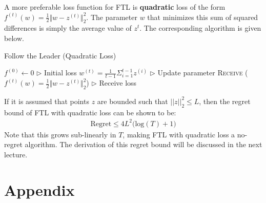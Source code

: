 \documentclass[11pt]{article}
\begin{document}
A more preferable loss function for FTL is \textbf{quadratic} loss of the form $f^{(t)}(w)=\frac{1}{2}\Vert w-z^{(t)}\Vert^2_2$. The parameter $w$ that minimizes this sum of squared differences is simply the average value of $z^{t}$. The corresponding algorithm is given below.
\begin{algorithm}[H]
\caption{Follow the Leader (Quadratic Loss)}
\label{algo:FTL_quadratic}
\begin{algorithmic}[1]
\STATE $f^{(0)} \leftarrow 0$ \hfill $\triangleright$ Initial loss
\STATE $w^{(t)} = \frac{1}{t-1}\Sigma_{i=1}^{t-1} {z}^{(i)}$ \hfill $\triangleright$ Update parameter
\STATE \textsc{Receive} ($f^{(t)}(w)=\frac{1}{2}\Vert w-z^{(t)}\Vert^2_2$) \hfill $\triangleright$ Receive loss
\ENDFOR
\end{algorithmic}
\end{algorithm}

If it is assumed that points $z$ are bounded such that $||z||^2_2 \leq L$, then the regret bound of FTL with quadratic loss can be shown to be:
\begin{align}
    \text{Regret} \leq 4L^2 \Big( \text{log}(T) + 1 \Big)
\end{align}
Note that this grows sub-linearly in $T$, making FTL with quadratic loss a no-regret algorithm. The derivation of this regret bound will be discussed in the next lecture.



{


}

\newpage
\section{Appendix}
\end{document}
